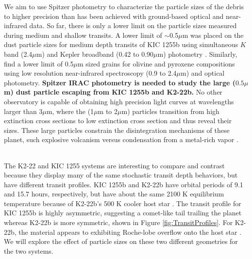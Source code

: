 \documentclass[letterpaper,12pt]{article}
\begin{document}
We aim to use Spitzer photometry to characterize the particle sizes of the debris to higher precision than has been achieved with ground-based optical and near-infrared data.
So far, there is only a lower limit on the particle sizes measured during medium and shallow transits.
A lower limit of $\sim$0.5$\mu$m was placed on the dust particle sizes for medium depth transits of KIC 1255b using simultaneous $K$ band (2.4$\mu$m) and Kepler broadband (0.42 to 0.90$\mu$m) photometry \citep{croll2014}.
Similarly, \citet{schlawin2016kic1255} find a lower limit of 0.5$\mu$m sized grains for olivine and pyroxene compositions using low resolution near-infrared spectroscopy (0.9 to 2.4$\mu$m) and optical photometry.
\textbf{Spitzer IRAC photometry is needed to study the large ($0.5\mu$m) dust particle escaping from KIC 1255b and K2-22b.}
No other observatory is capable of obtaining high precision light curves at wavelengths larger than 3$\mu$m, where the (1$\mu$m to 2$\mu$m) particles transition from high extinction cross sections to low extinction cross section and thus reveal their sizes.
These large particles constrain the disintegration mechanisms of these planet, such explosive volcanism versus condensation from a metal-rich vapor \citep{rappaport}.\newline

%

\\
The K2-22 and KIC 1255 systems are interesting to compare and contrast because they display many of the same stochastic transit depth behaviors, but have different transit profiles.
KIC 1255b and K2-22b have orbital periods of 9.1 and 15.7 hours, respectively, but have about the same 2100 K equilibrium temperature because of K2-22b's  500 K cooler host star \citep{sanchis-ojedak2-22}.
The transit profile for KIC 1255b is highly asymmetric, suggesting a comet-like tail trailing the planet whereas K2-22b is more symmetric, shown in Figure \ref{fig:TransitProfiles}.
For K2-22b, the material appears to exhibiting Roche-lobe overflow onto the host star \cite{sanchis-ojedak2-22}.
We will explore the effect of particle sizes on these two different geometries for the two systems.
\newline
\end{document}
